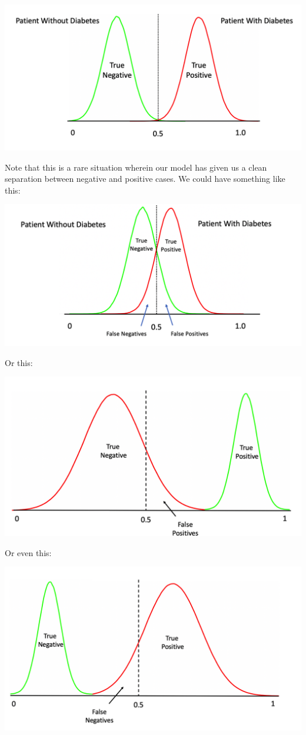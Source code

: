 \documentclass[
]{book}
\begin{document}
\includegraphics{./PICS/pc.png}

Note that this is a rare situation wherein our model has given us a clean separation between negative and positive cases. We could have something like this:

\includegraphics{./PICS/tnfp.png}

Or this:

\includegraphics{./PICS/sk2.png}

Or even this:

\includegraphics{./PICS/sk1.png}
\end{document}
